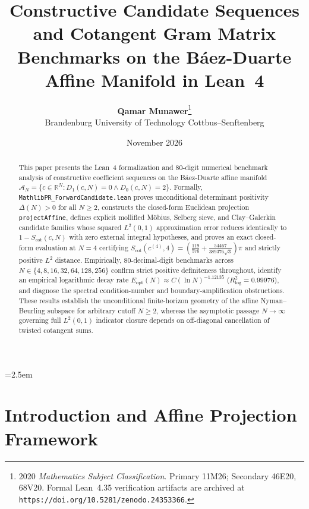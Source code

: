 \documentclass[11pt,a4paper]{article}
\title{\textbf{Constructive Candidate Sequences and Cotangent Gram Matrix Benchmarks on the B\'aez-Duarte Affine Manifold in Lean~4}}
\author{\textbf{Qamar Munawer}\thanks{2020 \emph{Mathematics Subject Classification}. Primary 11M26; Secondary 46E20, 68V20. Formal Lean~4.35 verification artifacts are archived at \texttt{https://doi.org/10.5281/zenodo.24353366}.}\\[0.3em]
\small Brandenburg University of Technology Cottbus--Senftenberg}
\date{November 2026}
\theoremstyle{definition}
\newcommand{\Rset}{\mathbb{R}}
\begin{document}
\linespread{1.15}\selectfont
\emergencystretch=2.5em

\maketitle

\begin{abstract}
This paper presents the Lean~4 formalization and $80$-digit numerical benchmark analysis of constructive coefficient sequences on the B\'aez-Duarte affine manifold $\mathcal{A}_N = \{c \in \Rset^N : D_1(c, N) = 0 \land D_0(c, N) = 2\}$. Formally, \texttt{MathlibPR\_\allowbreak ForwardCandidate.lean} proves unconditional determinant positivity $\Delta(N) > 0$ for all $N \ge 2$, constructs the closed-form Euclidean projection \texttt{projectAffine}, defines explicit mollified M\"obius, Selberg sieve, and Clay--Galerkin candidate families whose squared $L^2(0, 1)$ approximation error reduces identically to $1 - S_{\mathrm{cot}}(c, N)$ with zero external integral hypotheses, and proves an exact closed-form evaluation at $N = 4$ certifying $S_{\mathrm{cot}}(c^{(4)}, 4) = (\frac{119}{576} + \frac{54467}{389376\sqrt{3}})\pi$ and strictly positive $L^2$ distance. Empirically, $80$-decimal-digit benchmarks across $N \in \{4, 8, 16, 32, 64, 128, 256\}$ confirm strict positive definiteness throughout, identify an empirical logarithmic decay rate $E_{\mathrm{opt}}(N) \approx C(\ln N)^{-1.12135}$ ($R^2_{\log} = 0.99976$), and diagnose the spectral condition-number and boundary-amplification obstructions. These results establish the unconditional finite-horizon geometry of the affine Nyman--Beurling subspace for arbitrary cutoff $N \ge 2$, whereas the asymptotic passage $N \to \infty$ governing full $L^2(0, 1)$ indicator closure depends on off-diagonal cancellation of twisted cotangent sums.
\end{abstract}

\section{Introduction and Affine Projection Framework}
\end{document}
